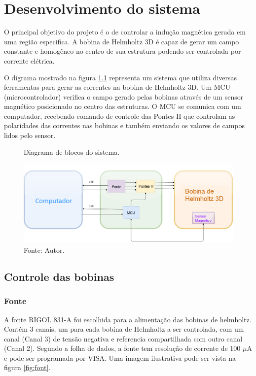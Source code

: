 \chapter{Desenvolvimento do sistema}

O principal objetivo do projeto é o de controlar a indução magnética gerada em uma região especifica. A bobina de Helmholtz 3D é capaz de gerar um campo constante e homogêneo no centro de sua estrutura podendo ser controlada por corrente elétrica.

O digrama mostrado na figura \ref{fig:diag2} representa um sistema que utiliza diversas ferramentas para gerar as correntes na bobina de Helmholtz 3D. Um MCU (microcontrolador) verifica o campo gerado pelas bobinas através de um sensor magnético posicionado no centro das estruturas. O MCU se comunica com um computador, recebendo comando de controle das Pontes H que controlam as polaridades das correntes nas bobinas e também enviando os valores de campos lidos pelo sensor.

\begin{figure}[H]
    \centering
     \caption{Diagrama de blocos do sistema.}
     \includegraphics[width=1\textwidth]{./img/diagramas/Blocks diagram 2.png}
     \caption*{Fonte: Autor.}
     \label{fig:diag2}
\end{figure}

\section{Controle das bobinas}

\subsection{Fonte}

A fonte RIGOL 831-A \cite{RG831A} foi escolhida para a alimentação das bobinas de helmholtz. Contém 3 canais, um para cada bobina de Helmholtz a ser controlada, com um canal (Canal 3) de tensão negativa e referencia compartilhada com outro canal (Canal 2). Segundo a folha de dados, a fonte tem resolução de corrente de 100 $\mu$A \cite{RG831A} e pode ser programada por VISA. Uma imagem ilustrativa pode ser vista na figura \ref{fig:font}.

